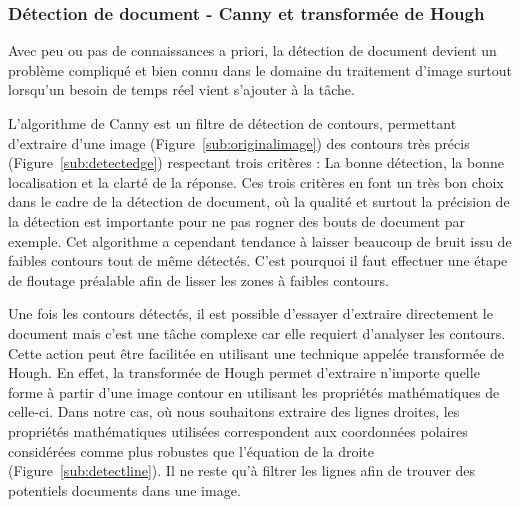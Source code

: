 \subsubsection{Détection de document - Canny et transformée de Hough}
\label{subsubsec:cannyhough} 
Avec peu ou pas de connaissances a priori, la détection de document devient un problème compliqué et bien connu dans le domaine du traitement d'image surtout lorsqu'un besoin de temps réel vient s'ajouter à la tâche.

L'algorithme de Canny\cite{Canny86acomputational} est un filtre de détection de contours, permettant d'extraire d'une image (Figure~\ref{sub:originalimage}) des contours très précis (Figure~\ref{sub:detectedge}) respectant trois critères : La bonne détection, la bonne localisation et la clarté de la réponse. Ces trois critères en font un très bon choix dans le cadre de la détection de document, où la qualité et surtout la précision de la détection est importante pour ne pas rogner des bouts de document par exemple. Cet algorithme a cependant tendance à laisser beaucoup de bruit issu de faibles contours tout de même détectés. C'est pourquoi il faut effectuer une étape de floutage préalable afin de lisser les zones à faibles contours.

Une fois les contours détectés, il est possible d'essayer d'extraire directement le document mais c'est une tâche complexe car elle requiert d'analyser les contours. Cette action peut être facilitée en utilisant une technique appelée transformée de Hough\cite{hough}. En effet, la transformée de Hough permet d'extraire n'importe quelle forme à partir d'une image contour en utilisant les propriétés mathématiques de celle-ci. Dans notre cas, où nous souhaitons extraire des lignes droites, les propriétés mathématiques utilisées correspondent aux coordonnées polaires considérées comme plus robustes que l’équation de la droite (Figure~\ref{sub:detectline}). Il ne reste qu'à filtrer les lignes afin de trouver des potentiels documents dans une image.

